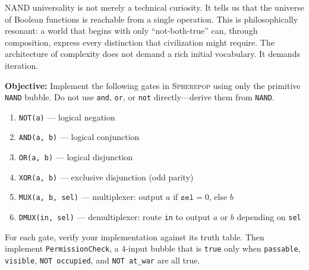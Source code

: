 \documentclass[11pt,a4paper,openany]{book}
\theoremstyle{plain}
\theoremstyle{definition}
\theoremstyle{remark}
\newenvironment{perspective}{%
  \begin{mdframed}[
    linecolor=spherered!40, backgroundcolor=spherered!4,
    linewidth=1pt, innertopmargin=8pt, innerbottommargin=8pt,
    innerleftmargin=10pt, innerrightmargin=10pt,
    skipabove=10pt, skipbelow=6pt
  ]%
  \setlength{\parindent}{0pt}%
  \noindent{\textcolor{spherered}{\textbf{Perspective}}}\par\smallskip\ignorespaces
}{\end{mdframed}}
\newenvironment{project}[1]{%
  \begin{tcolorbox}[
    title={\textbf{Project: #1}},
    colback=projectbg,
    colframe=sphereblue,
    fonttitle=\bfseries\color{white},
    coltitle=white,
    attach boxed title to top left={yshift=-2mm, xshift=4mm},
    boxed title style={colback=sphereblue, sharp corners},
    sharp corners,
    breakable,
    before upper={\normalfont\setlength{\parindent}{0pt}\tolerance=9999\hbadness=9999}
  ]
}{\end{tcolorbox}}
\newcommand{\Sp}{\textsc{Spherepop}\xspace}
\begin{document}
\begin{perspective}
  NAND universality is not merely a technical curiosity. It tells us that
  the universe of Boolean functions is reachable from a single operation.
  This is philosophically resonant: a world that begins with only
  ``not-both-true'' can, through composition, express every distinction
  that civilization might require. The architecture of complexity does not
  demand a rich initial vocabulary. It demands iteration.
\end{perspective}

\begin{project}{Boolean Gates}
  \textbf{Objective:} Implement the following gates in \Sp{} using only
  the primitive \texttt{NAND} bubble. Do not use \texttt{and}, \texttt{or},
  or \texttt{not} directly---derive them from \texttt{NAND}.

  \begin{enumerate}
    \item \texttt{NOT(a)} --- logical negation
    \item \texttt{AND(a, b)} --- logical conjunction
    \item \texttt{OR(a, b)} --- logical disjunction
    \item \texttt{XOR(a, b)} --- exclusive disjunction (odd parity)
    \item \texttt{MUX(a, b, sel)} --- multiplexer: output $a$ if
          $\texttt{sel} = 0$, else $b$
    \item \texttt{DMUX(in, sel)} --- demultiplexer: route \texttt{in}
          to output $a$ or $b$ depending on \texttt{sel}
  \end{enumerate}

  For each gate, verify your implementation against its truth table.
  Then implement \texttt{PermissionCheck}, a 4-input bubble that is
  \texttt{true} only when \texttt{passable}, \texttt{visible},
  \texttt{NOT occupied}, and \texttt{NOT at\_war} are all true.
\end{project}
\end{document}
